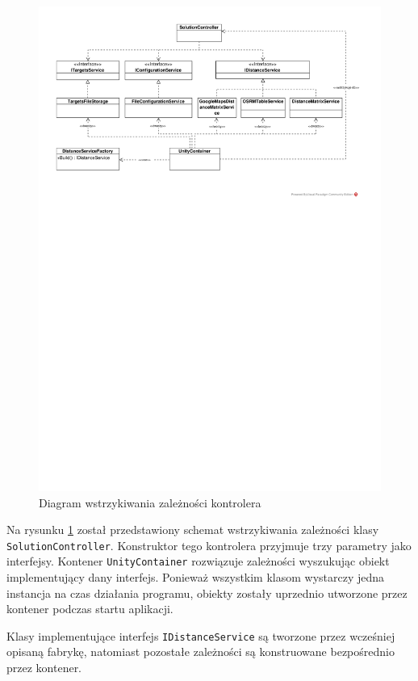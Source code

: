 \begin{figure}[htbp]
	\centering
	\includegraphics[clip, trim=1cm 19cm 1cm 1cm, width=1.00\textwidth]{uml/injection.pdf}
	\caption{Diagram wstrzykiwania zależności kontrolera}
	\label{fig:di}
\end{figure}

Na rysunku \ref{fig:di} został przedstawiony schemat wstrzykiwania zależności klasy \texttt{SolutionController}. Konstruktor tego kontrolera przyjmuje trzy parametry jako interfejsy. Kontener \texttt{UnityContainer} rozwiązuje zależności wyszukując obiekt implementujący dany interfejs. Ponieważ wszystkim klasom wystarczy jedna instancja na czas działania programu, obiekty zostały uprzednio utworzone przez kontener podczas startu aplikacji.

Klasy implementujące interfejs \texttt{IDistanceService} są tworzone przez wcześniej opisaną fabrykę, natomiast pozostałe zależności są konstruowane bezpośrednio przez kontener.

\clearpage